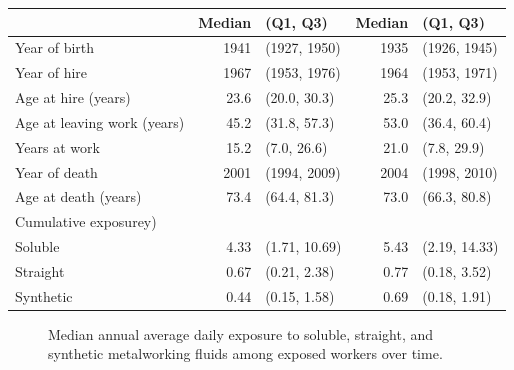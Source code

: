 \documentclass[
  11pt,
  letterpaper,
  DIV=11,
  numbers=noendperiod]{scrartcl}
\begin{document}
\begin{table}
{\begin{tabular}{lrlrl}
   \midrule & Median & (Q1, Q3) & Median & (Q1, Q3) \\
\midrule
Year of birth & 1941 & (1927, 1950) & 1935 & (1926, 1945) \\ 
  Year of hire & 1967 & (1953, 1976) & 1964 & (1953, 1971) \\ 
  Age at hire (years) & 23.6 & (20.0, 30.3) & 25.3 & (20.2, 32.9) \\ 
  Age at leaving work (years) & 45.2 & (31.8, 57.3) & 53.0 & (36.4, 60.4) \\ 
  Years at work & 15.2 & (7.0, 26.6) & 21.0 & (7.8, 29.9) \\ 
  Year of death & 2001 & (1994, 2009) & 2004 & (1998, 2010) \\ 
  Age at death (years) & 73.4 & (64.4, 81.3) & 73.0 & (66.3, 80.8) \\ 
  Cumulative exposurey) &  &  &  &  \\ 
  \hspace{2em}Soluble  & 4.33 & (1.71, 10.69) & 5.43 & (2.19, 14.33) \\ 
  \hspace{2em}Straight  & 0.67 & (0.21, 2.38) & 0.77 & (0.18, 3.52) \\ 
  \hspace{2em}Synthetic  & 0.44 & (0.15, 1.58) & 0.69 & (0.18, 1.91) \\ 
   \bottomrule
\end{tabular}

}

\end{table}%

\hfill\break

\begin{figure}

\caption{\label{fig-exposure}Median annual average daily exposure to
soluble, straight, and synthetic metalworking fluids among exposed
workers over time.}


\end{figure}%
\end{document}
